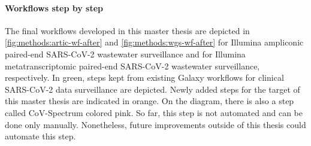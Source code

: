             \paragraph{Workflows step by step} \label{sec:methods:changes:step-by-step}
            The final workflows developed in this master thesis are depicted in \cref{fig:methods:artic-wf-after} and \cref{fig:methods:wgs-wf-after} for Illumina ampliconic paired-end SARS-CoV-2 wastewater surveillance and for Illumina metatranscriptomic paired-end SARS-CoV-2 wastewater surveillance, respectively. In green, steps kept from existing Galaxy workflows for clinical SARS-CoV-2 data surveillance are depicted. Newly added steps for the target of this master thesis are indicated in orange. On the diagram, there is also a step called CoV-Spectrum colored pink. So far, this step is not automated and can be done only manually. Nonetheless, future improvements outside of this thesis could automate this step.
